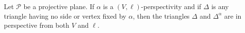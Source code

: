 Let $\mathcal{P}$ be a projective plane. If $\alpha$ is a $(V,\ell)$-perspectivity and if $\Delta$ is any triangle having no side or vertex fixed by $\alpha$, then the triangles $\Delta$ and $\Delta^\alpha$ are in perspective from both $V$ and $\ell$.
